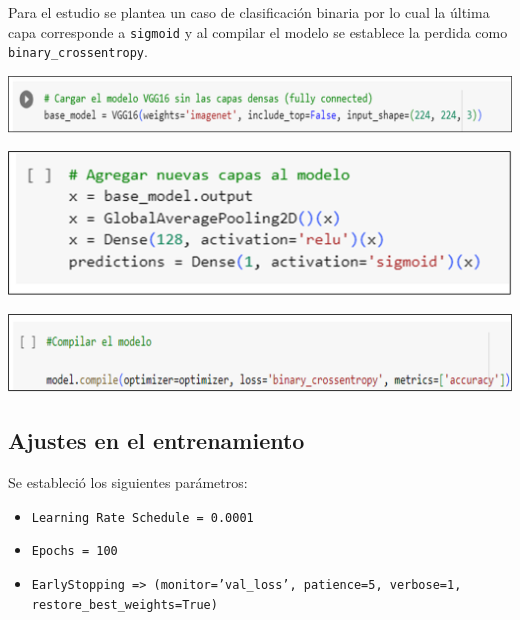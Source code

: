 \documentclass[12pt,twoside,titlepage]{ingenius}
\newenvironment{figura}
  {\par\bigskip\noindent\minipage{\linewidth}}
  {\endminipage\par\bigskip}
\begin{document}
\begin{multicols}{2}
Para el estudio se plantea un caso de clasificación binaria por lo cual la última capa corresponde a \texttt{sigmoid} y al compilar el modelo se establece la perdida como \texttt{binary\_crossentropy}.

\begin{figura}%
	\centering
	\includegraphics[scale=0.17]{figuras/fig4.png}
	\label{figura4}
\end{figura}

\begin{figura}%
	\centering
	\includegraphics[scale=0.24]{figuras/fig5.png}
	\label{figura5}
\end{figura}

\begin{figura}%
	\centering
	\includegraphics[scale=0.22]{figuras/fig6.png}
	\label{figura6}
\end{figura}


\subsection{Ajustes en el entrenamiento}
Se estableció los siguientes parámetros:
\begin{itemize}
	\item \texttt{Learning Rate Schedule = 0.0001}	
	\item \texttt{Epochs = 100}
	\item \texttt{EarlyStopping => (monitor='val\_loss', patience=5, verbose=1, \\ restore\_best\_weights=True)}
\end{itemize}


\end{multicols}
\end{document}
